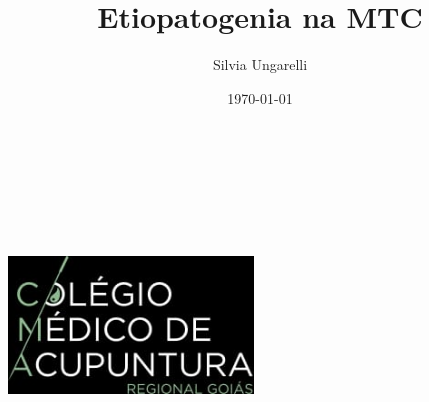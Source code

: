 \documentclass[12pt,oneside,a4paper]{book} %
\author{Silvia Ungarelli}
\title{Etiopatogenia na MTC}
\date{\today}
\newcommand{\HRule}{\rule{\linewidth}{0.5mm}}
\begin{document}
\begin{titlepage}
\begin{center}

\includegraphics[width=6.5cm,height=8.5cm]{pix/coverimg.jpg} %

\end{center}
\end{titlepage}



\maketitle 
\thispagestyle{empty}
\clearpage
\end{document}
